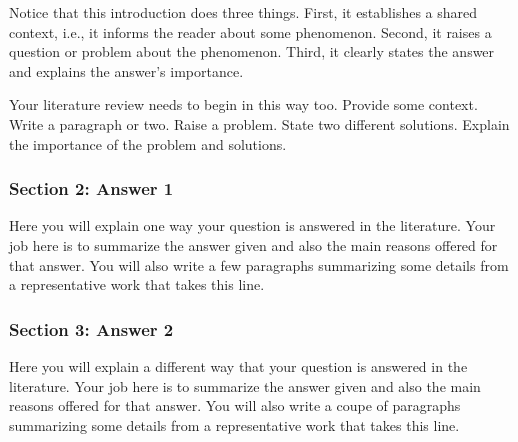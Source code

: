 \documentclass[]{article}
\begin{document}
Notice that this introduction does three things. First, it establishes a
shared context, i.e., it informs the reader about some phenomenon.
Second, it raises a question or problem about the phenomenon. Third, it
clearly states the answer and explains the answer's importance.

Your literature review needs to begin in this way too. Provide some
context. Write a paragraph or two. Raise a problem. State two different
solutions. Explain the importance of the problem and solutions.

\subsubsection{Section 2: Answer 1}\label{section-2-answer-1}

Here you will explain one way your question is answered in the
literature. Your job here is to summarize the answer given and also the
main reasons offered for that answer. You will also write a few
paragraphs summarizing some details from a representative work that
takes this line.

\subsubsection{Section 3: Answer 2}\label{section-3-answer-2}

Here you will explain a different way that your question is answered in
the literature. Your job here is to summarize the answer given and also
the main reasons offered for that answer. You will also write a coupe of
paragraphs summarizing some details from a representative work that
takes this line.
\end{document}
